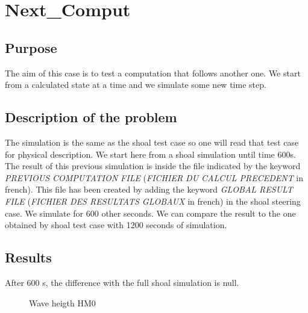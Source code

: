 \section{Next\_Comput}

\subsection{Purpose}
%
The aim of this case is to test a computation that follows another one. We start from a calculated state at a time and we simulate some new time step.
%
\subsection{Description of the problem}
%
The simulation is the same as the shoal test case so one will read that test case for physical description. We start here from a shoal simulation until time 600s. The result of this previous simulation is inside the file indicated by the keyword {\it PREVIOUS COMPUTATION FILE} ({\it FICHIER DU CALCUL PRECEDENT} in french). This file has been created by adding the keyword  {\it GLOBAL RESULT FILE} ({\it FICHIER DES RESULTATS GLOBAUX} in french) in the shoal steering case.
We simulate for 600 other seconds. We can compare the result to the one obtained by shoal test case with 1200 seconds of simulation.

\subsection{Results}
After 600 s, the difference with the full shoal simulation is null.
\begin{figure} [!h]
\centering
{}
 \caption{Wave heigth HM0}
\label{resnextcomp}
\end{figure}
